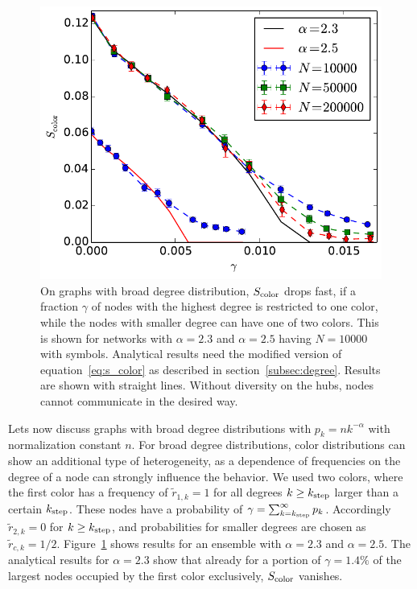 \documentclass[aps, pre, twocolumn, a4paper, superscriptaddress, floatfix]{revtex4}
\begin{document}
\begin{figure}[htb]
\begin{center}
    \includegraphics[width=1.0\columnwidth]{S_color_degree_dependent_broad.pdf}
    \caption{On graphs with broad degree distribution, $S_{\rm color}$ drops fast, 
    if a fraction $\gamma$ of nodes with the highest 
    degree is restricted to one color, while the nodes with smaller degree can have one of 
    two colors. This is shown for networks with $\alpha=2.3$ and $\alpha=2.5$ having $N=10000$ 
    with symbols. Analytical results need the modified version of equation~\ref{eq:s_color} 
    as described in section~\ref{subsec:degree}. Results are shown with straight lines. Without diversity 
    on the hubs, nodes cannot communicate in the desired way.}
    \label{fig:degree}
\end{center}
\end{figure}

Lets now discuss graphs with broad degree distributions with $p_k=n k^{-\alpha}$ 
with normalization constant $n$. 
For broad degree distributions, color distributions can show an additional type of 
heterogeneity, as a dependence of frequencies on the degree of a node can strongly 
influence the behavior. We used two colors, where the first color has a frequency 
of ${\tilde r}_{1,k}=1$ for all degrees $k\geq k_{\rm step}$ larger than a certain 
$k_{\rm step}$. These nodes have a probability of 
$\gamma=\sum_{k=k_{\rm step}}^{\infty} p_k$. Accordingly 
${\tilde r}_{2,k}=0$ for $k\geq k_{\rm step}$, and probabilities for smaller degrees are chosen as 
${\tilde r}_{c,k}=1/2$. Figure~\ref{fig:degree} shows results for an ensemble with 
$\alpha=2.3$ and $\alpha=2.5$. The analytical results for $\alpha=2.3$ show that already for a portion 
of $\gamma=1.4\%$ of the largest nodes occupied by the first color exclusively, $S_{\rm color}$ vanishes. 
\end{document}
